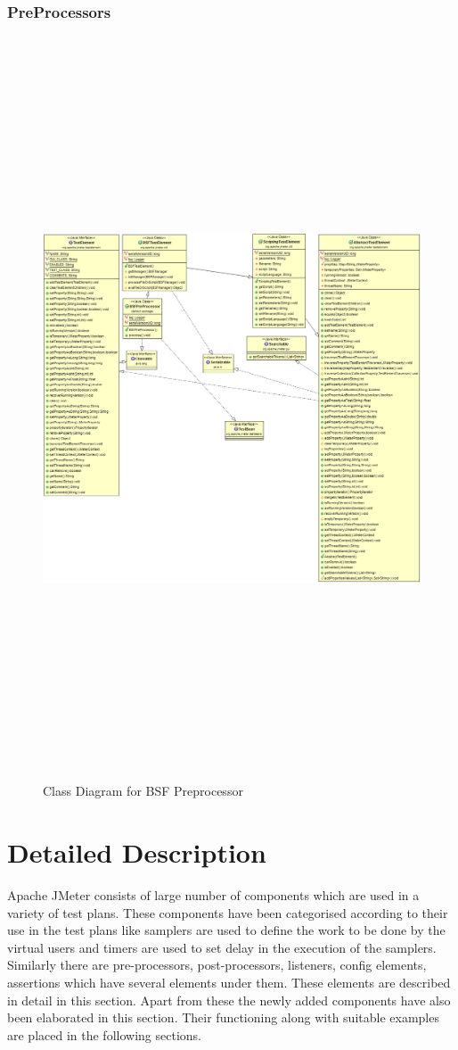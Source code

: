 \documentclass[12pt]{book}
\begin{document}
  \subsection{PreProcessors}
  \begin{figure}[H]
   \centering
   \includegraphics[width=17cm, height=22cm]{images/preprocessor_bsf}
   \caption{Class Diagram for BSF Preprocessor\label{fig:fig10_JMeter}}
  \end{figure}
  
\chapter{Detailed Description}
Apache JMeter consists of large number of components which are used in a variety of test plans.
These components have been categorised according to their use in the test plans like samplers are
used to define the work to be done by the virtual users and timers are used to set delay in the
execution of the samplers. Similarly there are pre-processors, post-processors, listeners, config
elements, assertions which have several elements under them. These elements are described in
detail in this section. Apart from these the newly added components have also been elaborated in
this section. Their functioning along with suitable examples are placed in the following sections. \cite{Ehh}
\end{document}
